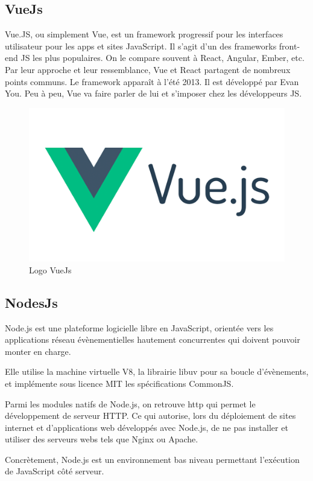 \subsection{VueJs}
Vue.JS, ou simplement Vue, est un framework progressif pour les interfaces utilisateur pour les apps et sites JavaScript. Il s’agit d’un des frameworks front-end JS les plus populaires. On le compare souvent à React, Angular, Ember, etc. Par leur approche et leur ressemblance, Vue et React partagent de nombreux points communs. Le framework apparaît à l’été 2013. Il est développé par Evan You. Peu à peu, Vue va faire parler de lui et s’imposer chez les développeurs JS.
\begin{figure}[h]
	\centering
    \includegraphics[scale=0.4]{img/part3/4.2}
    \caption{Logo VueJs}
\end{figure}

\subsection{NodesJs}
Node.js est une plateforme logicielle libre en JavaScript, orientée vers les applications réseau évènementielles hautement concurrentes qui doivent pouvoir monter en charge.

Elle utilise la machine virtuelle V8, la librairie libuv pour sa boucle d'évènements, et implémente sous licence MIT les spécifications CommonJS.

Parmi les modules natifs de Node.js, on retrouve http qui permet le développement de serveur HTTP. Ce qui autorise, lors du déploiement de sites internet et d'applications web développés avec Node.js, de ne pas installer et utiliser des serveurs webs tels que Nginx ou Apache.

Concrètement, Node.js est un environnement bas niveau permettant l’exécution de JavaScript côté serveur.

